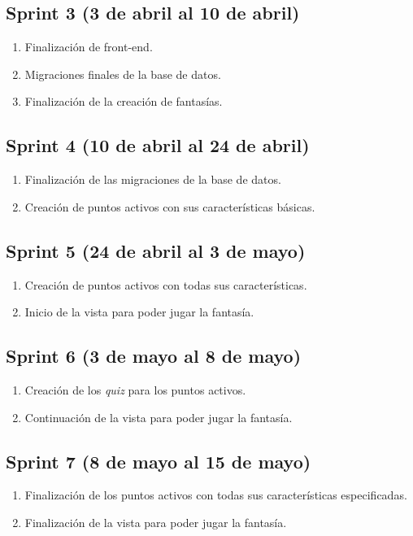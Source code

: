 \subsection{Sprint 3 (3 de abril al 10 de abril)}
\begin{enumerate}
	\item Finalización de front-end.
	\item Migraciones finales de la base de datos.
	\item Finalización de la creación de fantasías.
\end{enumerate}

\subsection{Sprint 4 (10 de abril al 24 de abril)}
\begin{enumerate}
	\item Finalización de las migraciones de la base de datos.
	\item Creación de puntos activos con sus características básicas.
\end{enumerate}

\subsection{Sprint 5 (24 de abril al 3 de mayo)}
\begin{enumerate}
	\item Creación de puntos activos con todas sus características.
	\item Inicio de la vista para poder jugar la fantasía.
\end{enumerate}

\subsection{Sprint 6 (3 de mayo al 8 de mayo)}
\begin{enumerate}
	\item Creación de los \textit{quiz} para los puntos activos.
	\item Continuación de la vista para poder jugar la fantasía.
\end{enumerate}

\subsection{Sprint 7 (8 de mayo al 15 de mayo)}
\begin{enumerate}
	\item Finalización de los puntos activos con todas sus características especificadas.
	\item Finalización de la vista para poder jugar la fantasía.
\end{enumerate}



